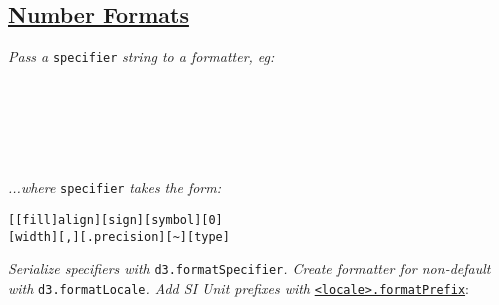 \begin{comment}
{\footnotesize
\begin{minipage}[t]{2.0cm}
    sortKeys\\
    map
\end{minipage}
\begin{minipage}[t]{2.0cm}
    sortValues\\
    object
\end{minipage}
\begin{minipage}[t]{2.0cm}
    rollup\\
    entries
\end{minipage}
}
\\[1mm]


\textit{To retrieve information from normal javascript objects, use: }\texttt{d3.keys}, \texttt{d3.values}\textit{, or }\texttt{d3.entries}.
\end{comment}


\ 


\subsection*{\href{https://github.com/d3/d3-format}{Number Formats}}
\textit{Pass a }\texttt{specifier}\textit{ string to a formatter, eg:}

\\
\\
\\
\\
\\


\textit{...where }\texttt{specifier}\textit{ takes the form:}
\begin{lstlisting}
[[fill]align][sign][symbol][0]
[width][,][.precision][~][type]
\end{lstlisting}

\textit{Serialize specifiers with }\texttt{d3.formatSpecifier}\textit{. Create formatter for non-default  with }\texttt{d3.formatLocale}\textit{. Add SI Unit prefixes with }\href{http://bl.ocks.org/mbostock/9764126}{\texttt{<locale>.formatPrefix}}:\\
\\




\vspace{2mm}
